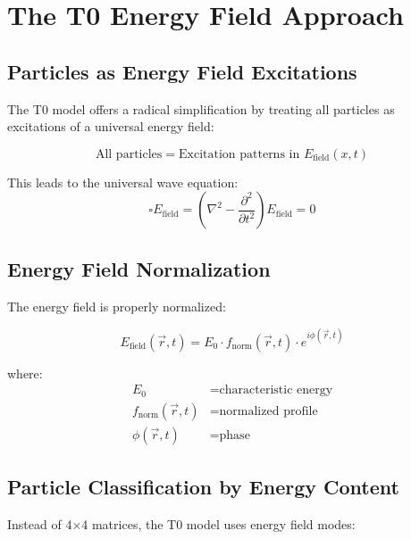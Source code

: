 \documentclass[12pt,a4paper]{report}
\begin{document}
\section{The T0 Energy Field Approach}
\label{sec:t0_energy_approach}

\subsection{Particles as Energy Field Excitations}
\label{subsec:energy_field_excitations}

The T0 model offers a radical simplification by treating all particles as excitations of a universal energy field:

\begin{equation}
	\boxed{\text{All particles} = \text{Excitation patterns in } E_{\text{field}}(x,t)}
\end{equation}

This leads to the universal wave equation:
\begin{equation}
	\boxed{\square E_{\text{field}} = \left(\nabla^2 - \frac{\partial^2}{\partial t^2}\right) E_{\text{field}} = 0}
	\label{eq:universal_wave_equation}
\end{equation}

\subsection{Energy Field Normalization}
\label{subsec:energy_field_normalization}

The energy field is properly normalized:

\begin{equation}
	E_{\text{field}}(\vec{r}, t) = E_0 \cdot f_{\text{norm}}(\vec{r}, t) \cdot e^{i\phi(\vec{r}, t)}
\end{equation}

where:
\begin{align}
	E_0 &= \text{characteristic energy} \\
	f_{\text{norm}}(\vec{r}, t) &= \text{normalized profile} \\
	\phi(\vec{r}, t) &= \text{phase}
\end{align}

\subsection{Particle Classification by Energy Content}
\label{subsec:particle_classification}

Instead of 4×4 matrices, the T0 model uses energy field modes:
\end{document}
